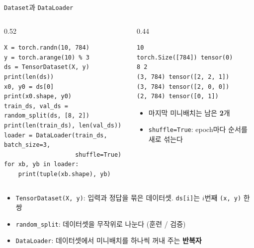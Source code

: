 \documentclass[aspectratio=169,11pt]{beamer}
\newcommand{\code}[1]{\texttt{#1}}
\begin{document}
\begin{frame}[fragile]{\code{Dataset}과 \code{DataLoader}}
\begin{columns}[T,onlytextwidth]
\begin{column}{0.52\textwidth}
\begin{lstlisting}
X = torch.randn(10, 784)
y = torch.arange(10) % 3
ds = TensorDataset(X, y)
print(len(ds))
x0, y0 = ds[0]
print(x0.shape, y0)
train_ds, val_ds = random_split(ds, [8, 2])
print(len(train_ds), len(val_ds))
loader = DataLoader(train_ds, batch_size=3,
                    shuffle=True)
for xb, yb in loader:
    print(tuple(xb.shape), yb)
\end{lstlisting}
\end{column}
\begin{column}{0.44\textwidth}
\begin{lstlisting}[style=outstyle]
10
torch.Size([784]) tensor(0)
8 2
(3, 784) tensor([2, 2, 1])
(3, 784) tensor([2, 0, 0])
(2, 784) tensor([0, 1])
\end{lstlisting}
\small
\begin{itemize}
\item 마지막 미니배치는 남은 \textbf{2}개
\item \code{shuffle=True}: epoch마다 순서를 새로 섞는다
\end{itemize}
\end{column}
\end{columns}
\vskip1mm
\begin{itemize}
\item \code{TensorDataset(X, y)}: 입력과 정답을 묶은 데이터셋. \code{ds[i]}는 $i$번째 \code{(x, y)} 한 쌍
\item \code{random\_split}: 데이터셋을 무작위로 나눈다 (훈련 / 검증)
\item \code{DataLoader}: 데이터셋에서 미니배치를 하나씩 꺼내 주는 \textbf{반복자}
\end{itemize}
\end{frame}
\end{document}
